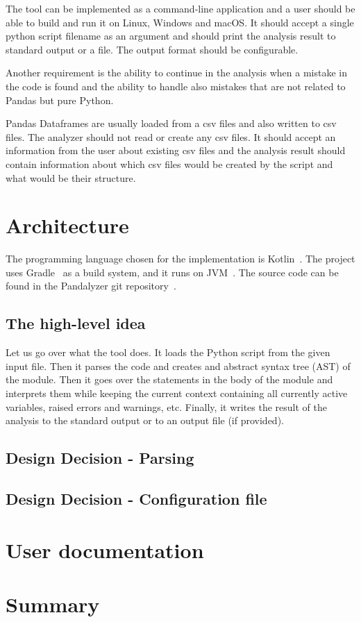 The tool can be implemented as a command-line application and a user should be able to build and run it on Linux,
Windows and macOS\@.
It should accept a single python script filename as an argument and should print the analysis result to standard output
or a file.
The output format should be configurable.

Another requirement is the ability to continue in the analysis when a mistake in the code is found and the ability
to handle also mistakes that are not related to Pandas but pure Python. %

Pandas Dataframes are usually loaded from a csv files and also written to csv files.
The analyzer should not read or create any csv files.
It should accept an information from the user about existing csv files and the analysis result should contain
information about which csv files would be created by the script and what would be their structure.

\section{Architecture}

The programming language chosen for the implementation is Kotlin~\cite{kotlinDocs}.
The project uses Gradle~\cite{gradleDocs} as a build system, and it runs on JVM~\cite{jvmSpec}\@.
The source code can be found in the Pandalyzer git repository~\cite{pandalyzer}.

\subsection{The high-level idea}

Let us go over what the tool does.
It loads the Python script from the given input file.
Then it parses the code and creates and abstract syntax tree (AST) of the module.
Then it goes over the statements in the body of the module and interprets them while keeping the current context
containing all currently active variables, raised errors and warnings, etc.
Finally, it writes the result of the analysis to the standard output or to an output file (if provided).


\subsection{Design Decision - Parsing}

\subsection{Design Decision - Configuration file}


\section{User documentation}

\section*{Summary}
